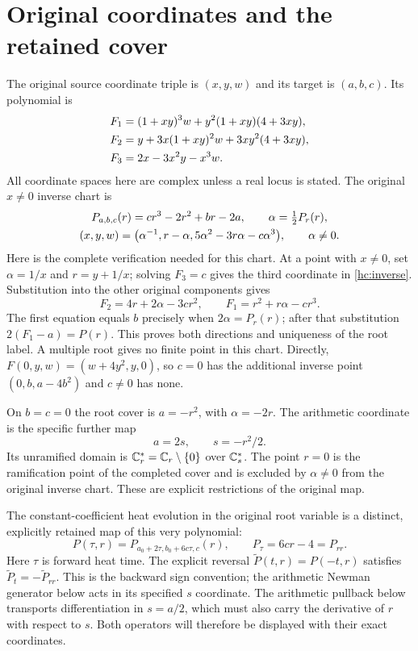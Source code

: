 \section{Original coordinates and the retained cover}
The original source coordinate triple is $(x,y,w)$ and its target is
$(a,b,c)$. Its polynomial is
\begin{align}
F_1&=(1+xy)^3w+y^2(1+xy)(4+3xy),\notag\\
F_2&=y+3x(1+xy)^2w+3xy^2(4+3xy),\notag\\
F_3&=2x-3x^2y-x^3w. \label{hc:F}
\end{align}
All coordinate spaces here are complex unless a real locus is stated.
The original $x\ne0$ inverse chart is
\begin{gather}
P_{a,b,c}(r)=cr^3-2r^2+br-2a,\qquad
\alpha=\tfrac12P_r(r),\notag\\
(x,y,w)=\bigl(\alpha^{-1},r-\alpha,
                  5\alpha^2-3r\alpha-c\alpha^3\bigr),\qquad \alpha\ne0.
\label{hc:inverse}
\end{gather}
Here is the complete verification needed for this chart. At a point
with $x\ne0$, set $\alpha=1/x$ and $r=y+1/x$; solving $F_3=c$
gives the third coordinate in \eqref{hc:inverse}. Substitution into
the other original components gives
\[
F_2=4r+2\alpha-3cr^2,\qquad F_1=r^2+r\alpha-cr^3.
\]
The first equation equals $b$ precisely when $2\alpha=P_r(r)$;
after that substitution $2(F_1-a)=P(r)$. This proves both directions
and uniqueness of the root label. A multiple root gives no finite
point in this chart. Directly, $F(0,y,w)=(w+4y^2,y,0)$, so $c=0$
has the additional inverse point $(0,b,a-4b^2)$ and $c\ne0$ has none.

On $b=c=0$ the root cover is $a=-r^2$, with $\alpha=-2r$.
The arithmetic coordinate is the specific further map
\begin{equation}
a=2s,\qquad s=-r^2/2. \label{hc:cover}
\end{equation}
Its unramified domain is $\mathbb C_r^*=\mathbb C_r\setminus\{0\}$ over
$\mathbb C_s^*$. The point $r=0$ is the ramification point of the completed
cover and is excluded by $\alpha\ne0$ from the original inverse chart.
These are explicit restrictions of the original map.

The constant-coefficient heat evolution in the original root variable
is a distinct, explicitly retained map of this very polynomial:
\[
P(\tau,r)=P_{a_0+2\tau,b_0+6c\tau,c}(r),\qquad
P_\tau=6cr-4=P_{rr}.
\]
Here $\tau$ is forward heat time. The explicit reversal
$\widetilde P(t,r)=P(-t,r)$ satisfies
$\widetilde P_t=-\widetilde P_{rr}$. This is the backward sign convention;
the arithmetic Newman generator below acts in its specified $s$ coordinate.
The arithmetic pullback below transports differentiation in $s=a/2$,
which must also carry the derivative of $r$ with respect to $s$.
Both operators will therefore be displayed with their exact coordinates.

